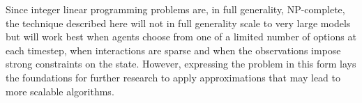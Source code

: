 \documentclass{article}
\begin{document}
Since integer linear programming problems are, in full generality, NP-complete, the technique described here will not in full generality scale to very large models but will work best when agents choose from one of a limited number of options at each timestep, when interactions are sparse and when the observations impose strong constraints on the state. However, expressing the problem in this form lays the foundations for further research to apply approximations that may lead to more scalable algorithms.





%
% 


\end{document}
